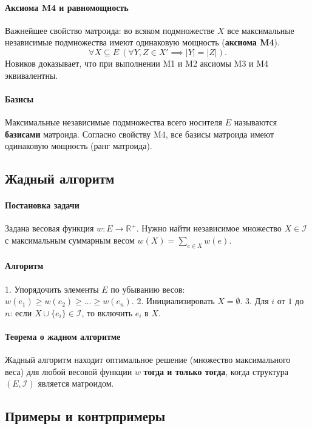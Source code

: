 \paragraph{Аксиома M4 и равномощность}
Важнейшее свойство матроида: во всяком подмножестве $X$ все максимальные независимые подмножества имеют одинаковую мощность (\textbf{аксиома M4}).
$$\forall X \subseteq E \ (\forall Y, Z \in X' \implies |Y| = |Z|).$$
Новиков доказывает, что при выполнении M1 и M2 аксиомы M3 и M4 эквивалентны.

\paragraph{Базисы}
Максимальные независимые подмножества всего носителя $E$ называются \textbf{базисами} матроида. Согласно свойству M4, все базисы матроида имеют одинаковую мощность (ранг матроида).

\subsection*{Жадный алгоритм}

\paragraph{Постановка задачи}
Задана весовая функция $w: E \to \mathbb{R}^+$. Нужно найти независимое множество $X \in \mathcal{I}$ с максимальным суммарным весом $w(X) = \sum_{e \in X} w(e)$.

\paragraph{Алгоритм}
1. Упорядочить элементы $E$ по убыванию весов: $w(e_1) \ge w(e_2) \ge \dots \ge w(e_n)$.
2. Инициализировать $X = \emptyset$.
3. Для $i$ от $1$ до $n$: если $X \cup \{e_i\} \in \mathcal{I}$, то включить $e_i$ в $X$.

\paragraph{Теорема о жадном алгоритме}
Жадный алгоритм находит оптимальное решение (множество максимального веса) для любой весовой функции $w$ \textbf{тогда и только тогда}, когда структура $(E, \mathcal{I})$ является матроидом.

\subsection*{Примеры и контрпримеры}

